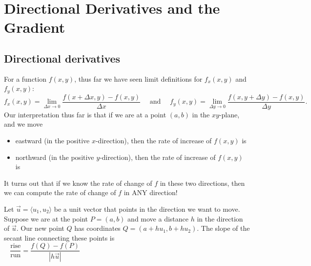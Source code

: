 \newlecture

\setcounter{section}{5}
\def\coursetopicnumber{II}
\def\topic{Directional Derivatives and the Gradient} %
\def\shorttopic{Directional derivatives, gradient} %
\def\textbookname{Active Calculus} %
\def\shorttextbookname{AC} %
\def\textbooksection{10.6} %
\def\textbooksectionurl{https://activecalculus.org/vector/S-10-6-Directional-Derivative.html} %
\def\handoutday{} %


\thispagestyle{plain}
\topstuff
\section{\topic{} \booklink{}}
\label{sec:directional-derivative-gradient}
\subsection{Directional derivatives}
For a function $f(x,y)$, thus far we have seen limit definitions for $f_x(x,y)$ and $f_y(x,y)$:
\[
    f_x(x,y)=\lim\limits_{\Delta x\to 0}\dfrac{f(x+\Delta x,y)-f(x,y)}{\Delta x}\quad \text{ and } \quad f_y(x,y)=\lim\limits_{\Delta y\to 0}\dfrac{f(x,y+\Delta y)-f(x,y)}{\Delta y}.
\] 
Our interpretation thus far is that if we are at a point $(a,b)$ in the $xy$-plane, and we move 
\begin{itemize}
    \item eastward (in the positive $x$-direction), then the rate of increase of $f(x,y)$ is 
    \item northward (in the positive $y$-direction), then the rate of increase of $f(x,y)$ is 
\end{itemize}
It turns out that if we know the rate of change of $f$ in these two directions, then we can compute the rate of change of $f$ in ANY direction!

\medskip 

Let $\vec{u}=\langle u_1,u_2\rangle$ be a unit vector that points in the direction we want to move. Suppose we are at the point $P=(a,b)$ and move a distance $h$ in the direction of $\vec{u}$. Our new point $Q$ has coordinates $Q=(a+hu_1,b+hu_2)$. The slope of the secant line connecting these points is 
\[
    \dfrac{\text{rise}}{\text{run}} =     \dfrac{f(Q)-f(P)}{|h\vec{u}|}\hspace{4in}\mbox{}
\]
\vspace{1in}


